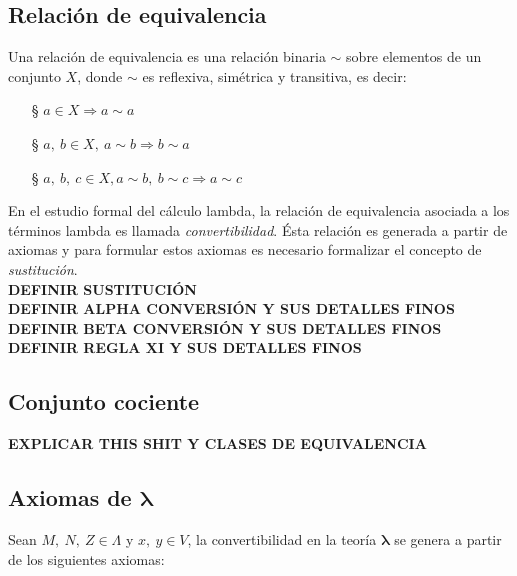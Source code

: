 \subsection{Relación de equivalencia}

Una relación de equivalencia es una relación binaria \(\sim\) sobre elementos de un
conjunto \(X\), donde \(\sim\) es reflexiva, simétrica y transitiva, es decir:

\begin{itemize}
\item[\S] \(a\in X \Rightarrow a\sim a\)
\item[\S] \(a,\ b\in X,\ a\sim b \Rightarrow b\sim a \)
\item[\S] \(a,\ b,\ c\in X, a\sim b,\ b\sim c \Rightarrow a\sim c\)
\end{itemize}

En el estudio formal del cálculo lambda, la relación de equivalencia asociada a
los términos lambda es llamada \emph{convertibilidad}. Ésta relación es generada
a partir de axiomas y para formular estos axiomas es necesario formalizar el
concepto de \emph{sustitución}.\\


\textbf{DEFINIR SUSTITUCIÓN}\\

\textbf{DEFINIR ALPHA CONVERSIÓN Y SUS DETALLES FINOS}\\

\textbf{DEFINIR BETA CONVERSIÓN Y SUS DETALLES FINOS}\\

\textbf{DEFINIR REGLA XI Y SUS DETALLES FINOS}\\

\subsection{Conjunto cociente}

\textbf{EXPLICAR THIS SHIT Y CLASES DE EQUIVALENCIA}\\

\subsection{Axiomas de \texorpdfstring{$\boldsymbol\lambda$}{lambda}}

Sean \(M,\ N,\ Z\in \Lambda\) y \(x,\ y\in V\), la convertibilidad en la teoría
\(\boldsymbol\lambda\) se genera a partir de los siguientes axiomas:

